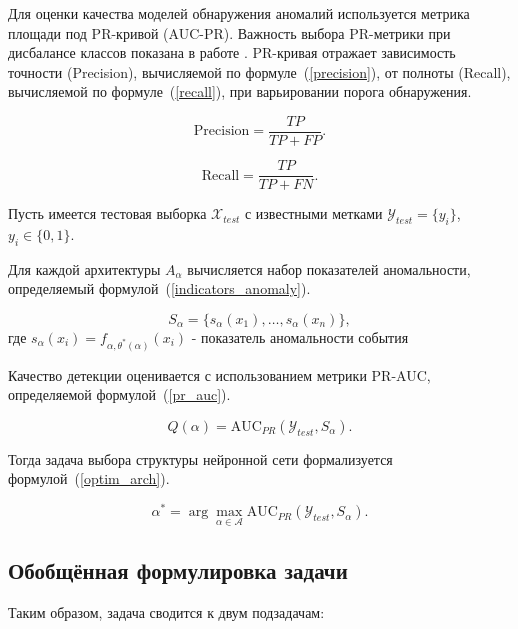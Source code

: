Для оценки качества моделей обнаружения аномалий используется метрика площади под PR-кривой (AUC-PR). Важность выбора PR-метрики при дисбалансе классов показана в работе \cite{PRCurve}. PR-кривая отражает зависимость точности (Precision), вычисляемой по формуле~(\ref{precision}), от полноты (Recall), вычисляемой по формуле~(\ref{recall}), при варьировании порога обнаружения.

\begin{equation}\label{precision}
    \mathrm{Precision} = \frac{TP}{TP + FP}.
\end{equation}

\begin{equation}\label{recall}
    \mathrm{Recall} = \frac{TP}{TP + FN}.
\end{equation}


Пусть имеется тестовая выборка $\mathcal{X}_{test}$ с известными метками
$\mathcal{Y}_{test} = \{y_i\}$, $y_i \in \{0,1\}$.

Для каждой архитектуры $A_\alpha$ вычисляется набор показателей аномальности, определяемый формулой~(\ref{indicators_anomaly}).

\begin{equation}\label{indicators_anomaly}
    S_\alpha = \{ s_\alpha(x_1), \dots, s_\alpha(x_n) \},
\end{equation}
где $s_{\alpha}(x_i) = f_{\alpha,\theta^*(\alpha)}(x_i)$ - показатель аномальности события

Качество детекции оценивается с использованием метрики PR-AUC, определяемой формулой~(\ref{pr_auc}).

\begin{equation}\label{pr_auc}
   Q(\alpha) = \mathrm{AUC}_{PR}(\mathcal{Y}_{test}, S_\alpha).
\end{equation}

Тогда задача выбора структуры нейронной сети формализуется формулой~(\ref{optim_arch}).

\begin{equation}\label{optim_arch}
   \alpha^* =\arg\max_{\alpha \in \mathcal{A}}\mathrm{AUC}_{PR}(\mathcal{Y}_{test}, S_\alpha).
\end{equation}

\subsection{Обобщённая формулировка задачи}

Таким образом, задача сводится к двум подзадачам:

